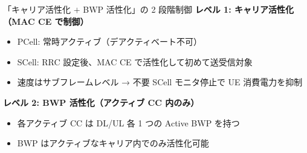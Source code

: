 \begin{frame}{「キャリア活性化 $+$ BWP 活性化」の 2 段階制御}
\textbf{レベル 1: キャリア活性化（MAC CE で制御）}
\begin{itemize}
  \item PCell: 常時アクティブ（デアクティベート不可）
  \item SCell: RRC 設定後、MAC CE で活性化して初めて送受信対象
  \item 速度はサブフレームレベル → 不要 SCell モニタ停止で UE 消費電力を抑制
\end{itemize}

\textbf{レベル 2: BWP 活性化（アクティブ CC 内のみ）}
\begin{itemize}
  \item 各アクティブ CC は DL/UL 各 1 つの Active BWP を持つ
  \item BWP はアクティブなキャリア内でのみ活性化可能
\end{itemize}
\end{frame}
